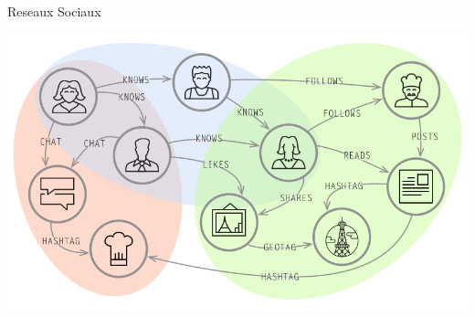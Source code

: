 \begin{frame}{Reseaux Sociaux}
    \begin{center}
        \colorbox{white}{\includegraphics[width=0.8 \textwidth]{img/usecase-social-color.png}}
\end{center}
\end{frame}
